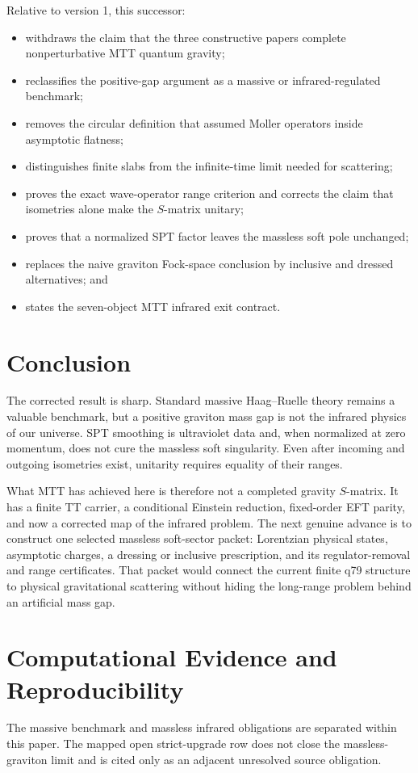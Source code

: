 \documentclass[11pt]{article}
\begin{document}
Relative to version 1, this successor:
\begin{itemize}
\item withdraws the claim that the three constructive papers complete
nonperturbative MTT quantum gravity;
\item reclassifies the positive-gap argument as a massive or
infrared-regulated benchmark;
\item removes the circular definition that assumed Moller operators inside
asymptotic flatness;
\item distinguishes finite slabs from the infinite-time limit needed for
scattering;
\item proves the exact wave-operator range criterion and corrects the claim
that isometries alone make the $S$-matrix unitary;
\item proves that a normalized SPT factor leaves the massless soft pole
unchanged;
\item replaces the naive graviton Fock-space conclusion by inclusive and
dressed alternatives; and
\item states the seven-object MTT infrared exit contract.
\end{itemize}

\section{Conclusion}

The corrected result is sharp. Standard massive Haag--Ruelle theory remains a
valuable benchmark, but a positive graviton mass gap is not the infrared
physics of our universe. SPT smoothing is ultraviolet data and, when
normalized at zero momentum, does not cure the massless soft singularity.
Even after incoming and outgoing isometries exist, unitarity requires equality
of their ranges.

What MTT has achieved here is therefore not a completed gravity $S$-matrix.
It has a finite TT carrier, a conditional Einstein reduction, fixed-order EFT
parity, and now a corrected map of the infrared problem. The next genuine
advance is to construct one selected massless soft-sector packet: Lorentzian
physical states, asymptotic charges, a dressing or inclusive prescription, and
its regulator-removal and range certificates. That packet would connect the
current finite q79 structure to physical gravitational scattering without
hiding the long-range problem behind an artificial mass gap.

\section*{Computational Evidence and Reproducibility}
The massive benchmark and massless infrared obligations are separated within this paper. The mapped open strict-upgrade row does not close the massless-graviton limit and is cited only as an adjacent unresolved source obligation.
\end{document}
